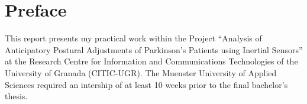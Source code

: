 \chapter*{Preface}

This report presents my practical work within the Project ``Analysis of Anticipatory Postural Adjustments of Parkinson's Patients using Inertial Sensors'' at the Research Centre for Information and Communications Technologies of the University of Granada (CITIC-UGR). The Muenster University of Applied Sciences required an intership of at least 10 weeks prior to the final bachelor's thesis.
